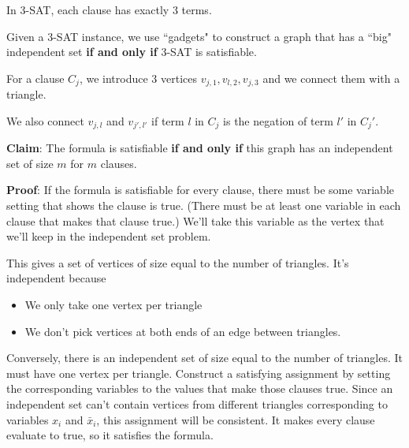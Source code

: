 \documentclass[12pt]{article}
\begin{document}
  In 3-SAT, each clause has exactly 3 terms.

  {
    Given a 3-SAT instance, we use ``gadgets" to construct a graph that has a
    ``big" independent set {\bf if and only if} 3-SAT is satisfiable.

    For a clause $C_j$, we introduce 3 vertices $v_{j, 1}, v_{l, 2}, v_{j, 3}$
    and we connect them with a triangle.

    We also connect $v_{j, l}$ and $v_{j', l'}$ if term $l$ in $C_j$ is the
    negation of term $l'$ in $C_j'$.


    {\bf Claim}: The formula is satisfiable {\bf if and only if} this graph
    has an independent set of size $m$ for $m$ clauses.

    {\bf Proof}: If the formula is satisfiable for every clause, there must be
    some variable setting that shows the clause is true. (There must be at least
    one variable in each clause that makes that clause true.) We'll take this
    variable as the vertex that we'll keep in the independent set problem.

    This gives a set of vertices of size equal to the number of triangles. It's
    independent because

    \begin{itemize}
      \item We only take one vertex per triangle
      \item We don't pick vertices at both ends of an edge between triangles.
    \end{itemize}


    Conversely, there is an independent set of size equal to the number of
    triangles. It must have one vertex per triangle. Construct a satisfying
    assignment by setting the corresponding variables to the values that make
    those clauses true. Since an independent set can't contain vertices from
    different triangles corresponding to variables $x_i$ and $\bar x_i$, this
    assignment will be consistent. It makes every clause evaluate to true, so it
    satisfies the formula.
  }
\end{document}
